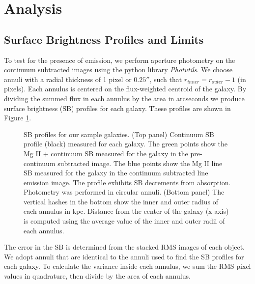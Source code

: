 \documentclass[twocolumn]{aastex61}
\begin{document}
\section{Analysis} \label{sec:analysis}

\subsection{Surface Brightness Profiles and Limits}\label{sec.sb}
To test for the presence of  emission, we perform aperture photometry on the continuum subtracted images using the python library \emph{Photutils}. We choose annuli with a radial thickness of 1 pixel or $0.25 ''$, such that $r_{inner}=r_{outer}-1$ (in pixels). Each annulus is centered on the flux-weighted centroid of the galaxy. By dividing the summed flux in each annulus by the area in arcseconds we produce surface brightness (SB) profiles for each galaxy. These profiles are shown in Figure \ref{fig:sb_profiles}. 

\begin{figure}
\centering
{}
\caption{SB profiles for our sample galaxies. (Top panel) Continuum SB profile (black) measured for each galaxy. The green points show the Mg II + continuum SB measured for the galaxy in the pre-continuum subtracted image. The blue points show the Mg II line SB measured for the galaxy in the continuum subtracted line emission image.  The profile exhibits SB decrements from  absorption. Photometry was performed in circular annuli. (Bottom panel) The vertical hashes in the bottom show the inner and outer radius of each annulus in kpc. Distance from the center of the galaxy (x-axis) is computed using the average value of the inner and outer radii of each annulus.}
\label{fig:sb_profiles}
\end{figure}

The error in the SB is determined from the stacked RMS images of each object.  We adopt annuli that are identical to the annuli used to find the SB profiles for each galaxy. To calculate the variance inside each annulus, we sum the RMS pixel values in quadrature, then divide by the area of each annulus. 
\end{document}
